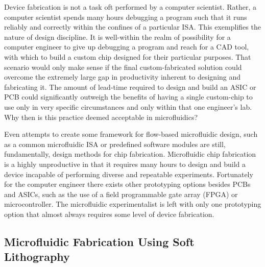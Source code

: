 Device fabrication is not a task oft performed by a computer scientist. Rather, a computer scientist spends many hours debugging a program such that it runs reliably and correctly within the confines of a particular ISA. This exemplifies the nature of design discipline. It is well-within the realm of possibility for a computer engineer to give up debugging a program and reach for a CAD tool, with which to build a custom chip designed for their particular purposes. That scenario would only make sense if the final custom-fabricated solution could overcome the extremely large gap in productivity inherent to designing and fabricating it. The amount of lead-time required to design and build an ASIC or PCB could significantly outweigh the benefits of having a single custom-chip to use only in very specific circumstances and only within that one engineer's lab. Why then is this practice deemed acceptable in microfluidics?

Even attempts to create some framework for flow-based microfluidic design, such as a common microfluidic ISA\cite{amin2009} or predefined software modules \cite{soe2013} are still, fundamentally, design methods for chip fabrication. Microfluidic chip fabrication is a highly unproductive in that it requires many hours to design and build a device incapable of performing diverse and repeatable experiments. Fortunately for the computer engineer there exists other prototyping options besides PCBs and ASICs, such as the use of a field programmable gate array (FPGA) or microcontroller. The microfluidic experimentalist is left with only one prototyping option that almost always requires some level of device
fabrication.


\subsection{Microfluidic Fabrication Using Soft Lithography}
\label{ssec:backgroundSL}

